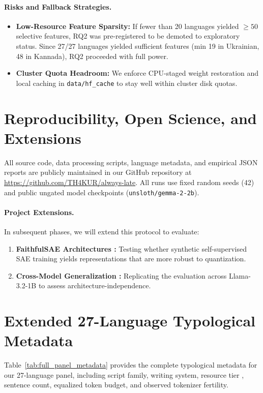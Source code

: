 \documentclass[11pt]{article}
\begin{document}
\paragraph{Risks and Fallback Strategies.}
\begin{itemize}
    \item \textbf{Low-Resource Feature Sparsity:} If fewer than 20 languages yielded $\ge 50$ selective features, RQ2 was pre-registered to be demoted to exploratory status. Since 27/27 languages yielded sufficient features (min 19 in Ukrainian, 48 in Kannada), RQ2 proceeded with full power.
    \item \textbf{Cluster Quota Headroom:} We enforce CPU-staged weight restoration and local caching in \texttt{data/hf\_cache} to stay well within cluster disk quotas.
\end{itemize}

\section{Reproducibility, Open Science, and Extensions}
All source code, data processing scripts, language metadata, and empirical JSON reports are publicly maintained in our GitHub repository at \url{https://github.com/TH4KUR/always-late}. All runs use fixed random seeds (42) and public ungated model checkpoints (\texttt{unsloth/gemma-2-2b}). 

\paragraph{Project Extensions.}
In subsequent phases, we will extend this protocol to evaluate:
\begin{enumerate}
    \item \textbf{FaithfulSAE Architectures \citep{cho2025faithfulsae}:} Testing whether synthetic self-supervised SAE training yields representations that are more robust to quantization.
    \item \textbf{Cross-Model Generalization \citep{he2024llama}:} Replicating the evaluation across Llama-3.2-1B to assess architecture-independence.
\end{enumerate}




\clearpage
\appendix
\section{Extended 27-Language Typological Metadata}
\label{sec:appendix_panel}
Table~\ref{tab:full_panel_metadata} provides the complete typological metadata for our 27-language panel, including script family, writing system, resource tier \citep{joshi2020state}, sentence count, equalized token budget, and observed tokenizer fertility.
\end{document}

